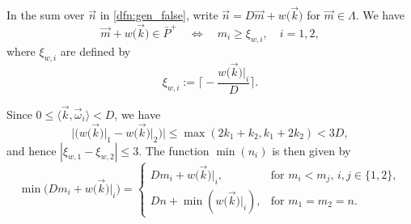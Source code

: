 \documentclass[pdftex]{sigma}
\theoremstyle{definition}
\numberwithin{equation}{section}
\begin{document}
In the sum over $\vec n$ in \eqref{dfn:gen_false}, write $\vec n=D\vec{m}+w\bigl(\vec{k}\bigr)$ for $\vec m\in \Lambda$. We have
\begin{equation*}
	\vec{m}+w\bigl(\vec{k}\bigr)\in \bar P^+ \quad \Leftrightarrow \quad m_i \geq \xi_{w,i}	, \quad i=1,2,
\end{equation*}
where $\xi_{w,i}$ are defined by
\begin{equation*}
	\xi_{w,i}:= \biggl\lceil - \frac{w\bigl(\vec{k}\bigr)\vert_i}{D} \biggr\rceil .
\end{equation*}

Since $0\leq \langle \vec k, \vec\omega_i\rangle < D$, we have
\begin{equation*}
	\big|\bigl(w\bigl(\vec{k}\bigr)\lvert_1-w\bigl(\vec{k}\bigr)\lvert_2\bigr)\big|\leq \max (2k_1+k_2, k_1+2k_2)< 3D,
\end{equation*} and hence $|\xi_{w,1}-\xi_{w,2}|\leq 3$.
The function $\min (n_i)$ is then given by
\begin{equation*}
	\min \bigl(Dm_i + w\bigl(\vec{k}\bigr)\vert_i\bigr) = \begin{cases}
		Dm_i + w\bigl(\vec{k}\bigr)\vert_i, & \text{for } m_i<m_{j}
		, \, i,j\in\{1,2\}, \\
		Dn + \min (w\bigl(\vec{k}\bigr)\vert_i), & \text{for } m_1=m_2=n
		.
	\end{cases}
\end{equation*}
\end{document}
